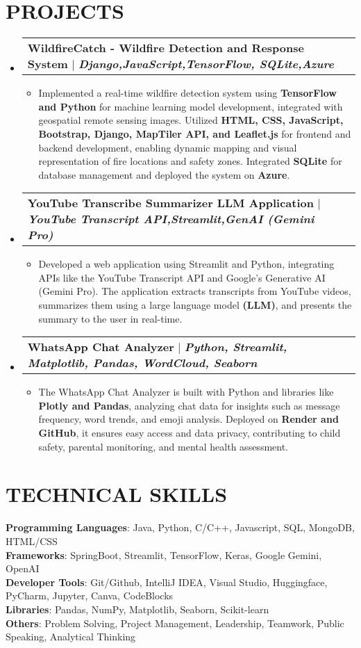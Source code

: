 \documentclass[letterpaper,11pt]{article}
\makeatletter
\newcommand{\resumeItem}[1]{\item\small{#1 \vspace{-2pt}}}
\newcommand{\resumeProjectHeading}[2]{
    \item
    \begin{tabular*}{0.97\textwidth}{l@{\extracolsep{\fill}}r}
      \small#1 & #2 \\
    \end{tabular*}\vspace{-7pt}
}
\newcommand{\resumeSubHeadingListStart}{\begin{itemize}[leftmargin=0.15in, label={}]}
\newcommand{\resumeSubHeadingListEnd}{\end{itemize}}
\newcommand{\resumeItemListStart}{\begin{itemize}}
\newcommand{\resumeItemListEnd}{\end{itemize}\vspace{-5pt}}
\makeatother
\begin{document}
\section{\textbf{PROJECTS}}
\resumeSubHeadingListStart
    \resumeProjectHeading
          {\textbf{WildfireCatch - Wildfire Detection and Response System} $|$ \emph{\textbf{Django,JavaScript,TensorFlow, SQLite,Azure}}}{}
          \resumeItemListStart
            \resumeItem{Implemented a real-time wildfire detection system using \textbf{TensorFlow and Python} for machine learning model development, integrated with geospatial remote sensing images. Utilized \textbf{HTML, CSS, JavaScript, Bootstrap, Django, MapTiler API, and Leaflet.js }for frontend and backend development, enabling dynamic mapping and visual representation of fire locations and safety zones. Integrated \textbf{SQLite} for database management and deployed the system on \textbf{Azure}.}
          \resumeItemListEnd
    \resumeProjectHeading
          {\textbf{YouTube Transcribe Summarizer LLM Application} $|$ \emph{\textbf{YouTube Transcript API,Streamlit,GenAI (Gemini Pro)}}}{}
          \resumeItemListStart
            \resumeItem{Developed a web application using Streamlit and Python, integrating APIs like the YouTube Transcript API and Google's Generative AI (Gemini Pro). The application extracts transcripts from YouTube videos, summarizes them using a large language model \textbf{(LLM)}, and presents the summary to the user in real-time.}
          \resumeItemListEnd
      \resumeProjectHeading
          {\textbf{WhatsApp Chat Analyzer} $|$ \emph{\textbf{Python, Streamlit, Matplotlib, Pandas, WordCloud, Seaborn}}}{}
          \resumeItemListStart
            \resumeItem{The WhatsApp Chat Analyzer is built with Python and libraries like \textbf{Plotly and Pandas}, analyzing chat data for insights such as message frequency, word trends, and emoji analysis. Deployed on \textbf{Render and GitHub}, it ensures easy access and data privacy, contributing to child safety, parental monitoring, and mental health assessment.}
          \resumeItemListEnd
\resumeSubHeadingListEnd

\section{\textbf{TECHNICAL SKILLS}}
\begin{itemize}[leftmargin=0.15in, label={}]
    \small{\item{
     \textbf{Programming Languages}{: Java, Python, C/C++, Javascript, SQL, MongoDB, HTML/CSS} \\
     \textbf{Frameworks}{: SpringBoot, Streamlit, TensorFlow, Keras, Google Gemini, OpenAI} \\
     \textbf{Developer Tools}{: Git/Github, IntelliJ IDEA, Visual Studio, Huggingface, PyCharm, Jupyter, Canva, CodeBlocks} \\
     \textbf{Libraries}{: Pandas, NumPy, Matplotlib, Seaborn, Scikit-learn} \\
     \textbf{Others}{: Problem Solving, Project Management, Leadership, Teamwork, Public Speaking, Analytical Thinking}
    }}
\end{itemize}
\end{document}
